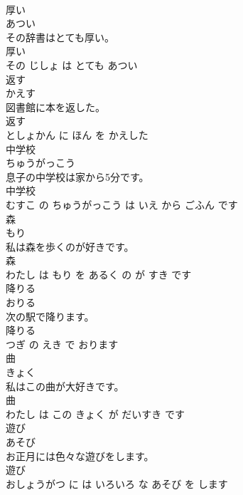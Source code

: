 \documentclass[8pt]{extreport}
\begin{document}
\begin{CJK}{UTF8}{min}
\\	厚い	
\\	あつい			
\\	その辞書はとても厚い。	
\\	厚い 
\\	その じしょ は とても あつい			
\\	返す	
\\	かえす			
\\	図書館に本を返した。	
\\	返す 
\\	としょかん に ほん を かえした			
\\	中学校	
\\	ちゅうがっこう			
\\	息子の中学校は家から5分です。	
\\	中学校 
\\	むすこ の ちゅうがっこう は いえ から ごふん です			
\\	森	
\\	もり			
\\	私は森を歩くのが好きです。	
\\	森 
\\	わたし は もり を あるく の が すき です			
\\	降りる	
\\	おりる			
\\	次の駅で降ります。	
\\	降りる 
\\	つぎ の えき で おります			
\\	曲	
\\	きょく			
\\	私はこの曲が大好きです。	
\\	曲 
\\	わたし は この きょく が だいすき です			
\\	遊び	
\\	あそび			
\\	お正月には色々な遊びをします。	
\\	遊び 
\\	おしょうがつ に は いろいろ な あそび を します			
\end{CJK}
\end{document}
